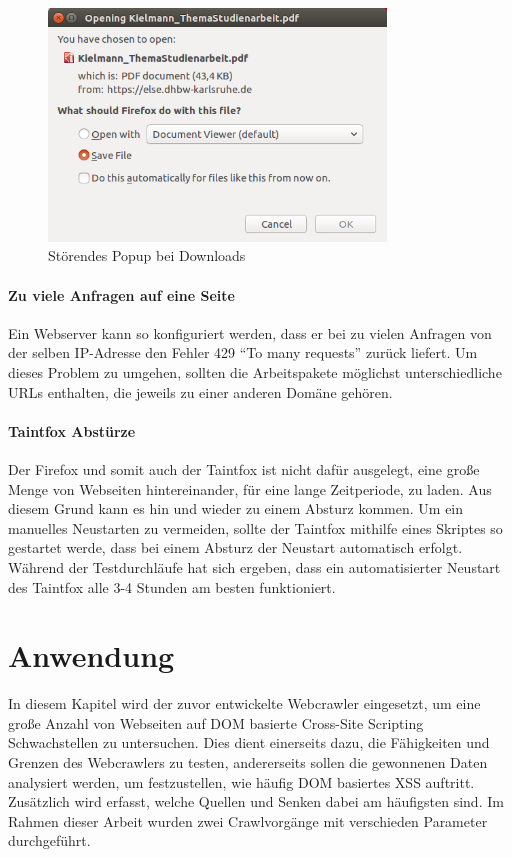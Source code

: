\begin{figure}[h]
	\centering
	\includegraphics[width=0.8\textwidth]{Bilder/DownloadScreenshot.png}
	\caption{Störendes Popup bei Downloads}
	\label{fig:DownloadPopup}
\end{figure}

\subsubsection{Zu viele Anfragen auf eine Seite}
Ein Webserver kann so konfiguriert werden, dass er bei zu vielen Anfragen von der selben IP-Adresse den Fehler 429 \enquote{To many requests} zurück liefert. Um dieses Problem zu umgehen, sollten die Arbeitspakete möglichst unterschiedliche URLs enthalten, die jeweils zu einer anderen Domäne gehören.

\subsubsection{Taintfox Abstürze}
Der Firefox und somit auch der Taintfox ist nicht dafür ausgelegt, eine große Menge von Webseiten hintereinander, für eine lange Zeitperiode, zu laden. Aus diesem Grund kann es hin und wieder zu einem Absturz kommen. Um ein manuelles Neustarten zu vermeiden, sollte der Taintfox mithilfe eines Skriptes so gestartet werde, dass bei einem Absturz der Neustart automatisch erfolgt. Während der Testdurchläufe hat sich ergeben, dass ein automatisierter Neustart des Taintfox alle 3-4 Stunden am besten funktioniert.

\chapter{Anwendung}
In diesem Kapitel wird der zuvor entwickelte Webcrawler eingesetzt, um eine große Anzahl von Webseiten auf DOM basierte Cross-Site Scripting Schwachstellen zu untersuchen. Dies dient einerseits dazu, die Fähigkeiten und Grenzen des Webcrawlers zu testen, andererseits sollen die gewonnenen Daten analysiert werden, um festzustellen, wie häufig DOM basiertes XSS auftritt. Zusätzlich wird erfasst, welche Quellen und Senken dabei am häufigsten sind. Im Rahmen dieser Arbeit wurden zwei Crawlvorgänge mit verschieden Parameter durchgeführt.
